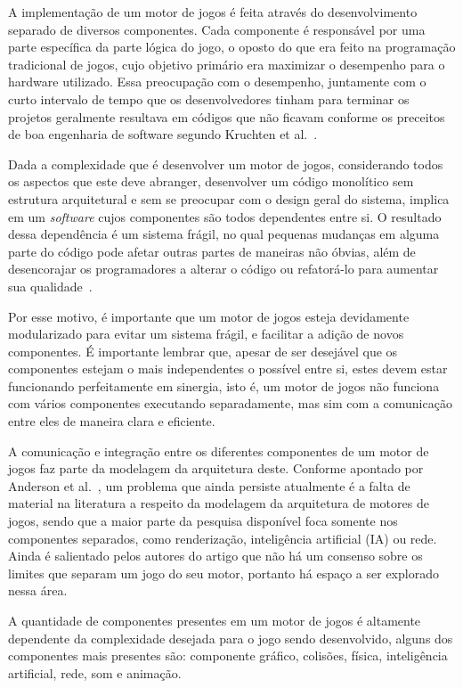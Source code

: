 A implementação de um motor de jogos é feita através do desenvolvimento separado de 
diversos componentes. Cada componente é responsável por uma parte específica da parte 
lógica do jogo, o oposto do que era feito na programação tradicional de jogos, cujo 
objetivo primário era maximizar o desempenho para o hardware utilizado. Essa preocupação 
com o desempenho, juntamente com o curto intervalo de tempo que os desenvolvedores tinham 
para terminar os projetos geralmente resultava em códigos que não ficavam conforme os 
preceitos de boa engenharia de software segundo Kruchten et al.~\cite{Kruchten2006}.

Dada a complexidade que é desenvolver um motor de jogos, considerando todos os aspectos que 
este deve abranger, desenvolver um código monolítico sem estrutura arquitetural e sem se 
preocupar com o design geral do sistema, implica em um \textit{software} cujos componentes 
são todos dependentes entre si. O resultado dessa dependência é um sistema frágil, no qual 
pequenas mudanças em alguma parte do código pode afetar outras partes de maneiras não 
óbvias, além de desencorajar os programadores a alterar o código ou refatorá-lo para 
aumentar sua qualidade~\cite{Keenan2011}.

Por esse motivo, é importante que um motor de jogos esteja devidamente modularizado para 
evitar um sistema frágil, e facilitar a adição de novos componentes. É importante lembrar 
que, apesar de ser desejável que os componentes estejam o mais independentes o possível 
entre si, estes devem estar funcionando perfeitamente em sinergia, isto é, um motor de 
jogos não funciona com vários componentes executando separadamente, mas sim com a 
comunicação entre eles de maneira clara e eficiente.

A comunicação e integração entre os diferentes componentes de um motor de jogos faz parte 
da modelagem da arquitetura deste. Conforme apontado por Anderson et 
al.~\cite{Anderson2008}, um problema que ainda persiste atualmente é a falta de material 
na literatura a respeito da modelagem da arquitetura de motores de jogos, sendo que a 
maior parte da pesquisa disponível foca somente nos componentes separados, como 
renderização, inteligência artificial (IA) ou rede. Ainda é salientado pelos autores do 
artigo que não há um consenso sobre os limites que separam um jogo do seu motor, portanto 
há espaço a ser explorado nessa área.

A quantidade de componentes presentes em um motor de jogos é altamente dependente da 
complexidade desejada para o jogo sendo desenvolvido, alguns dos componentes mais 
presentes são: componente gráfico, colisões, física, inteligência artificial, rede, som 
e animação.

